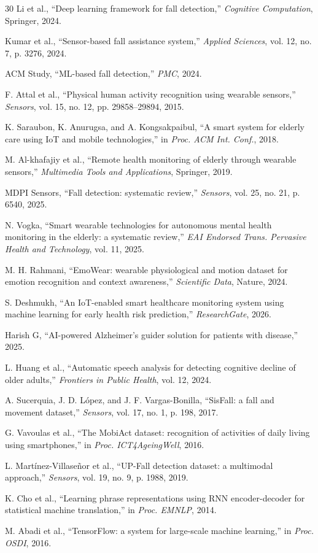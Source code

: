 \documentclass[conference]{IEEEtran}
\begin{document}
\begin{thebibliography}{30}
Li et al., ``Deep learning framework for fall detection,'' \textit{Cognitive Computation}, Springer, 2024.

Kumar et al., ``Sensor-based fall assistance system,'' \textit{Applied Sciences}, vol. 12, no. 7, p. 3276, 2024.

ACM Study, ``ML-based fall detection,'' \textit{PMC}, 2024.

F. Attal et al., ``Physical human activity recognition using wearable sensors,'' \textit{Sensors}, vol. 15, no. 12, pp. 29858--29894, 2015.

K. Saraubon, K. Anurugsa, and A. Kongsakpaibul, ``A smart system for elderly care using IoT and mobile technologies,'' in \textit{Proc. ACM Int. Conf.}, 2018.

M. Al-khafajiy et al., ``Remote health monitoring of elderly through wearable sensors,'' \textit{Multimedia Tools and Applications}, Springer, 2019.

MDPI Sensors, ``Fall detection: systematic review,'' \textit{Sensors}, vol. 25, no. 21, p. 6540, 2025.

N. Vogka, ``Smart wearable technologies for autonomous mental health monitoring in the elderly: a systematic review,'' \textit{EAI Endorsed Trans. Pervasive Health and Technology}, vol. 11, 2025.

M. H. Rahmani, ``EmoWear: wearable physiological and motion dataset for emotion recognition and context awareness,'' \textit{Scientific Data}, Nature, 2024.

S. Deshmukh, ``An IoT-enabled smart healthcare monitoring system using machine learning for early health risk prediction,'' \textit{ResearchGate}, 2026.

Harish G, ``AI-powered Alzheimer's guider solution for patients with disease,'' 2025.

L. Huang et al., ``Automatic speech analysis for detecting cognitive decline of older adults,'' \textit{Frontiers in Public Health}, vol. 12, 2024.

A. Sucerquia, J. D. L\'{o}pez, and J. F. Vargas-Bonilla, ``SisFall: a fall and movement dataset,'' \textit{Sensors}, vol. 17, no. 1, p. 198, 2017.

G. Vavoulas et al., ``The MobiAct dataset: recognition of activities of daily living using smartphones,'' in \textit{Proc. ICT4AgeingWell}, 2016.

L. Mart\'{i}nez-Villase\~{n}or et al., ``UP-Fall detection dataset: a multimodal approach,'' \textit{Sensors}, vol. 19, no. 9, p. 1988, 2019.

K. Cho et al., ``Learning phrase representations using RNN encoder-decoder for statistical machine translation,'' in \textit{Proc. EMNLP}, 2014.

M. Abadi et al., ``TensorFlow: a system for large-scale machine learning,'' in \textit{Proc. OSDI}, 2016.

\end{thebibliography}
\end{document}
